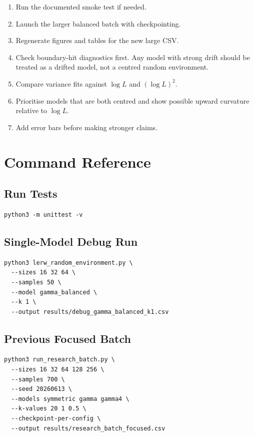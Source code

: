 \documentclass[11pt]{article}
\begin{document}
\begin{enumerate}
  \item Run the documented smoke test if needed.
  \item Launch the larger balanced batch with checkpointing.
  \item Regenerate figures and tables for the new large CSV.
  \item Check boundary-hit diagnostics first. Any model with strong drift
        should be treated as a drifted model, not a centred random environment.
  \item Compare variance fits against $\log L$ and $(\log L)^2$.
  \item Prioritise models that are both centred and show possible upward
        curvature relative to $\log L$.
  \item Add error bars before making stronger claims.
\end{enumerate}

\appendix

\section{Command Reference}

\subsection{Run Tests}
\begin{verbatim}
python3 -m unittest -v
\end{verbatim}

\subsection{Single-Model Debug Run}
\begin{verbatim}
python3 lerw_random_environment.py \
  --sizes 16 32 64 \
  --samples 50 \
  --model gamma_balanced \
  --k 1 \
  --output results/debug_gamma_balanced_k1.csv
\end{verbatim}

\subsection{Previous Focused Batch}
\begin{verbatim}
python3 run_research_batch.py \
  --sizes 16 32 64 128 256 \
  --samples 700 \
  --seed 20260613 \
  --models symmetric gamma gamma4 \
  --k-values 20 1 0.5 \
  --checkpoint-per-config \
  --output results/research_batch_focused.csv
\end{verbatim}
\end{document}
